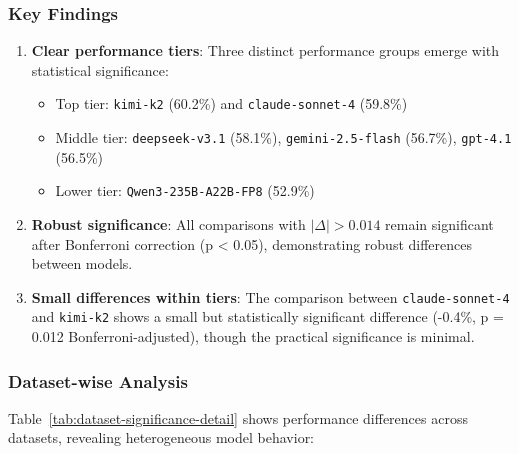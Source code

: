 \subsubsection{Key Findings}

\begin{enumerate}
    \item \textbf{Clear performance tiers}: Three distinct performance groups emerge with statistical significance:
    \begin{itemize}
        \item Top tier: \texttt{kimi-k2} (60.2\%) and \texttt{claude-sonnet-4} (59.8\%)
        \item Middle tier: \texttt{deepseek-v3.1} (58.1\%), \texttt{gemini-2.5-flash} (56.7\%), \texttt{gpt-4.1} (56.5\%)
        \item Lower tier: \texttt{Qwen3-235B-A22B-FP8} (52.9\%)
    \end{itemize}

    \item \textbf{Robust significance}: All comparisons with $|\Delta| > 0.014$ remain significant after Bonferroni correction (p < 0.05), demonstrating robust differences between models.

    \item \textbf{Small differences within tiers}: The comparison between \texttt{claude-sonnet-4} and \texttt{kimi-k2} shows a small but statistically significant difference (-0.4\%, p = 0.012 Bonferroni-adjusted), though the practical significance is minimal.
\end{enumerate}

\subsubsection{Dataset-wise Analysis}

Table~\ref{tab:dataset-significance-detail} shows performance differences across datasets, revealing heterogeneous model behavior:

